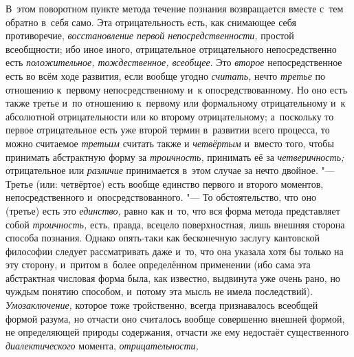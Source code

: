 В~этом поворотном пункте метода течение познания возвращается
вместе с~тем обратно в~себя само. Эта отрицательность есть, как снимающее
себя противоречие, {\em восстановление
первой непосредственности,} простой всеобщности; ибо иное
иного, отрицательное отрицательного непосредственно есть
{\em положительное, тождественное, всеобщее}. Это {\em второе}
непосредственное есть во всём ходе развития, если вообще угодно {\em считать,}
нечто {\em третье} по отношению к~первому непосредственному и~к
опосредствованному. Но оно есть также третье и~по отношению к~первому или
формальному отрицательному и~к абсолютной отрицательности или ко второму
отрицательному; а~поскольку то первое отрицательное есть уже второй термин
в~развитии всего процесса, то можно считаемое {\em третьим} считать
также и {\em четвёртым} и~вместо того, чтобы принимать абстрактную форму за
{\em троичность,} принимать её за {\em четверичность;} отрицательное или
{\em различие} принимается в~этом случае за нечто двойное. "---
Третье (или: четвёртое) есть вообще единство первого и
второго моментов, непосредственного и~опосредствованного. "---
То обстоятельство, что оно (третье) есть это {\em единство,} равно как
и~то, что вся форма метода представляет собой {\em троичность,} есть,
правда, всецело поверхностная, лишь внешняя сторона способа познания.
Однако опять-таки как бесконечную заслугу кантовской
философии
следует рассматривать даже и~то, что она указала хотя бы
только на эту сторону, и~притом в~более определённом применении (ибо сама
эта абстрактная числовая форма была, как известно, выдвинута уже очень
рано, но чуждым понятию способом, и~потому эта мысль не имела последствий).
{\em Умозаключение,} которое тоже тройственно, всегда признавалось всеобщей
формой разума, но отчасти оно считалось вообще совершенно внешней формой, не
определяющей природы содержания, отчасти же ему недостаёт существенного
{\em диалектического} момента, {\em отрицательности,}
